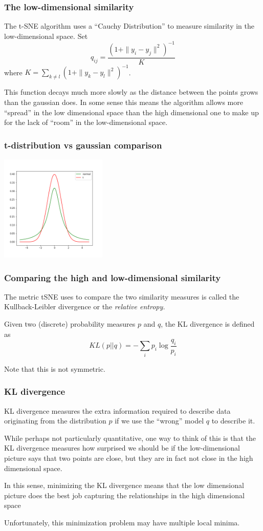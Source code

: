 \documentclass{beamer}
\begin{document}
\begin{frame}
  \frametitle{The low-dimensional similarity}
  The t-SNE algorithm uses a ``Cauchy Distribution'' to measure similarity in the low-dimensional space. Set
  $$
  q_{ij}=\frac{(1+\|y_i-y_j\|^2)^{-1}}{K}
  $$
  where $K=\sum_{k\not=l}(1+\|y_k-y_l\|^2)^{-1}$.
  \bigskip\noindent

  This function decays much more slowly as the distance between the points grows than the gaussian does.  In some sense this means
  the algorithm allows more ``spread'' in the low dimensional space than the high dimensional one to make up for the lack of ``room''
  in the low-dimensional space.
\end{frame}
\begin{frame}
  \frametitle{t-distribution vs gaussian comparison}
\begin{center}
  \includegraphics[width=2in]{norm_t.png}
\end{center}
\end{frame}
\begin{frame}
  \frametitle{Comparing the high and low-dimensional similarity}
  The metric tSNE uses to compare the two similarity measures is called the Kullback-Leibler divergence or the {\it relative entropy.}
  \bigskip\noindent
  
  Given two (discrete) probability
  measures $p$ and $q$, the KL divergence is defined as
  $$
  KL(p||q)=-\sum_{i} p_i\log\frac{q_i}{p_i}
  $$

  Note that this is not symmetric.
\end{frame}
\begin{frame}
  \frametitle{KL divergence}

  KL divergence measures the extra information required to describe data originating from the distribution $p$ if we use the ``wrong'' model $q$
  to describe it.
  \bigskip\noindent

  While perhaps not particularly quantitative, one way to think of this is that the KL divergence measures how surprised we should be if
  the low-dimensional picture says that two points are close, but they are in fact not close in the high dimensional space.
  \bigskip\noindent

  In this sense, minimizing the KL divergence means that the low dimensional picture does the best job capturing the relationships in the high
  dimensional space

  \bigskip\noindent

  Unfortunately, this minimization problem may have multiple local minima.
\end{frame}
\end{document}
